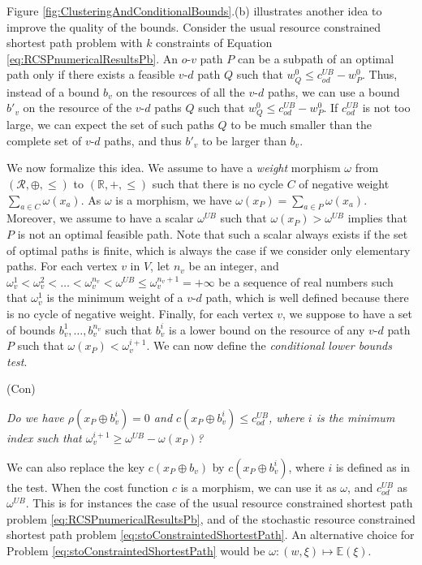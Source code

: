 \documentclass[11pt]{amsart}
\theoremstyle{plain}
\theoremstyle{remark}
\def\E{\mathbb{E}}
\newcommand{\rplus}{\oplus}
\newcommand{\rleq}{\leqslant}
\newcommand{\rset}{\mathcal{R}}
\newcommand{\rcost}{c}
\newcommand{\rmeas}{\rho}
\newcommand{\re}{x}
\begin{document}
Figure \ref{fig:ClusteringAndConditionalBounds}.(b) illustrates another idea to improve the quality of the bounds. Consider the usual resource constrained shortest path problem with $k$ constraints of Equation \eqref{eq:RCSPnumericalResultsPb}. An $o$-$v$ path $P$ can be a subpath of an optimal path only if there exists a feasible $v$-$d$ path $Q$ such that $w_{Q}^{0} \leq c_{od}^{UB} - w_{P}^{0}$. Thus, instead of a bound $b_{v}$ on the resources of all the $v$-$d$ paths, we can use a bound $b'_{v}$ on the resource of the $v$-$d$ paths $Q$ such that $w_{Q}^{0} \leq c_{od}^{UB} - w_{P}^{0}$. If $c_{od}^{UB}$ is not too large, we can expect the set of such paths $Q$ to be much smaller than the complete set of $v$-$d$ paths, and thus $b'_{v}$ to be larger than $b_{v}$. 

We now formalize this idea. We assume to have a \emph{weight} morphism $\omega$ from $(\rset,\rplus,\rleq)$ to $(\mathbb{R},+,\leq)$ such that there is no cycle $C$ of negative weight $\sum_{a \in C} \omega(\re_{a})$. As $\omega$ is a morphism, we have $\omega(\re_{P}) = \sum_{a \in P}\omega(\re_{a})$. Moreover, we assume to have a scalar $\omega^{UB}$ such that $\omega(\re_{P}) > \omega^{UB}$ implies that $P$ is not an optimal feasible path. Note that such a scalar always exists if the set of optimal paths is finite, which is always the case if we consider only elementary paths. For each vertex $v$ in $V$, let $n_{v}$ be an integer, and $\omega_{v}^{1} < \omega_{v}^{2}< \ldots < \omega_{v}^{n_{v}} < \omega^{UB} \rleq \omega_{v}^{n_{v} + 1} = +\infty$ be a sequence of real numbers such that $\omega_{v}^{1}$ is the minimum weight of a $v$-$d$ path, which is well defined because there is no cycle of negative weight. Finally, for each vertex $v$, we suppose to have a set of bounds $b_{v}^{1}, \ldots, b_{v}^{n_{v}}$ such that $b_{v}^{i}$ is a lower bound on the resource of any $v$-$d$ path $P$ such that $\omega(\re_{P}) < \omega_{v}^{i+1}$. We can now define the \emph{conditional lower bounds test}.

\smallskip 
	(Con) \begin{minipage}{\dimexpr\textwidth-2cm} \emph{Do we have $\rmeas(\re_{P} \rplus b_{v}^{i})= 0$ and $\rcost(\re_{P} \rplus b_{v}^{i}) \leq \rcost_{od}^{UB}$, where $i$ is the minimum index such that $\omega_{v}^{i+1} \geq \omega^{UB}-\omega(\re_{P})$?}
	\end{minipage}
\smallskip

\noindent We can also replace the key $\rcost(\re_{P} \rplus b_{v})$ by $\rcost(\re_{P} \rplus b_{v}^{i})$, where $i$ is defined as in the test. When the cost function $c$ is a morphism, we can use it as $\omega$, and $c_{od}^{UB}$ as $\omega^{UB}$. This is for instances the case of the usual resource constrained shortest path problem \eqref{eq:RCSPnumericalResultsPb}, and of the stochastic resource constrained shortest path problem \eqref{eq:stoConstraintedShortestPath}. An alternative choice for Problem \eqref{eq:stoConstraintedShortestPath}  would be $\omega : (w,\xi) \mapsto \E(\xi)$.
\end{document}
